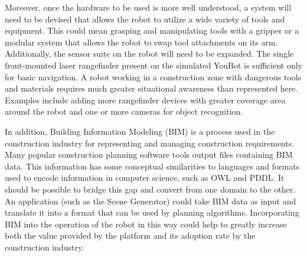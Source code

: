 Moreover, once the hardware to be used is more well understood, a system will need to be devised that allows the robot to utilize a wide variety of tools and equipment. This could mean grasping and manipulating tools with a gripper or a modular system that allows the robot to swap tool attachments on its arm. Additionally, the sensor suite on the robot will need to be expanded. The single front-mounted laser rangefinder present on the simulated YouBot is sufficient only for basic navigation. A robot working in a construction zone with dangerous tools and materials requires much greater situational awareness than represented here. Examples include adding more rangefinder devices with greater coverage area around the robot and one or more cameras for object recognition.

In addition, Building Information Modeling (BIM) is a process used in the construction industry for representing and managing construction requirements. Many popular construction planning software tools output files containing BIM data. This information has some conceptual similarities to languages and formats used to encode information in computer science, such as OWL and PDDL. It should be possible to bridge this gap and convert from one domain to the other. An application (such as the Scene Generator) could take BIM data as input and translate it into a format that can be used by planning algorithms. Incorporating BIM into the operation of the robot in this way could help to greatly increase both the value provided by the platform and its adoption rate by the construction industry.